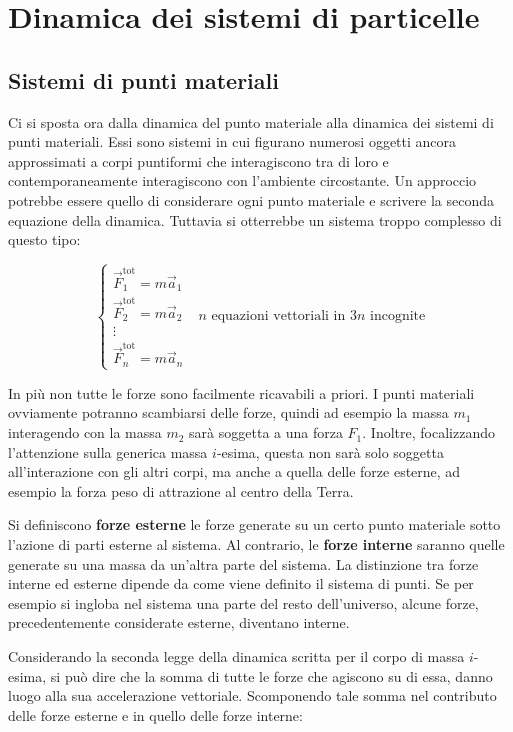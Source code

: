 \chapter{Dinamica dei sistemi di particelle}

\section{Sistemi di punti materiali}

Ci si sposta ora dalla dinamica del punto materiale alla dinamica dei sistemi di punti materiali. Essi sono sistemi in cui figurano numerosi oggetti ancora approssimati a corpi puntiformi che interagiscono tra di loro e contemporaneamente interagiscono con l'ambiente circostante.
Un approccio potrebbe essere quello di considerare ogni punto materiale e scrivere la seconda equazione della dinamica. Tuttavia si otterrebbe un sistema troppo complesso di questo tipo:

\[
	\begin{cases} \vec{F}_1^\text{tot}=m\vec{a}_1 \\ \vec{F}_2^\text{tot}=m\vec{a}_2 \\ \vdots \\ \vec{F}_n^\text{tot}=m\vec{a}_n  \end{cases} \text{ $n$ equazioni vettoriali in $3n$ incognite}
\]

In più non tutte le forze sono facilmente ricavabili a priori. I punti materiali ovviamente potranno scambiarsi delle forze, quindi ad esempio la massa $m_1$ interagendo con la massa $m_2$ sarà soggetta a una forza $F_1$. Inoltre, focalizzando l'attenzione sulla generica massa $i$-esima, questa non sarà solo soggetta all'interazione con gli altri corpi, ma anche a quella delle forze esterne, ad esempio la forza peso di attrazione al centro della Terra.

Si definiscono \textbf{forze esterne} le forze generate su un certo punto materiale sotto l'azione di parti esterne al sistema. Al contrario, le \textbf{forze interne} saranno quelle generate su una massa da un'altra parte del sistema.
La distinzione tra forze interne ed esterne dipende da come viene definito il sistema di punti. Se per esempio si ingloba nel sistema una parte del resto dell'universo, alcune forze, precedentemente considerate esterne, diventano interne.

Considerando la seconda legge della dinamica scritta per il corpo di massa $i$-esima, si può dire che la somma di tutte le forze che agiscono su di essa, danno luogo alla sua accelerazione vettoriale. Scomponendo tale somma nel contributo delle forze esterne e in quello delle forze interne:

